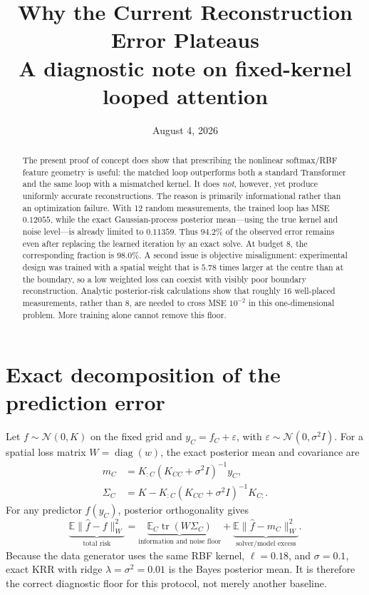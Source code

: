 \documentclass[10pt]{article}
\title{Why the Current Reconstruction Error Plateaus\\
\large A diagnostic note on fixed-kernel looped attention}
\author{}
\date{August 4, 2026}
\begin{document}
\maketitle
\vspace{-2.2em}

\begin{abstract}
The present proof of concept does show that prescribing the nonlinear
softmax/RBF feature geometry is useful: the matched loop outperforms both a
standard Transformer and the same loop with a mismatched kernel.  It does
\emph{not}, however, yet produce uniformly accurate reconstructions.  The
reason is primarily informational rather than an optimization failure.  With
12 random measurements, the trained loop has MSE $0.12055$, while the exact
Gaussian-process posterior mean---using the true kernel and noise level---is
already limited to $0.11359$.  Thus $94.2\%$ of the observed error remains
even after replacing the learned iteration by an exact solve.  At budget 8,
the corresponding fraction is $98.0\%$.  A second issue is objective
misalignment: experimental design was trained with a spatial weight that is
$5.78$ times larger at the centre than at the boundary, so a low weighted loss
can coexist with visibly poor boundary reconstruction.  Analytic posterior-risk
calculations show that roughly 16 well-placed measurements, rather than 8, are
needed to cross MSE $10^{-2}$ in this one-dimensional problem.  More training
alone cannot remove this floor.
\end{abstract}

\section{Exact decomposition of the prediction error}

Let $f\sim\mathcal N(0,K)$ on the fixed grid and
$y_C=f_C+\varepsilon$, with
$\varepsilon\sim\mathcal N(0,\sigma^2 I)$.  For a spatial loss matrix
$W=\operatorname{diag}(w)$, the exact posterior mean and covariance are
\begin{align}
 m_C &= K_{:C}(K_{CC}+\sigma^2I)^{-1}y_C,\\
 \Sigma_C &= K-K_{:C}(K_{CC}+\sigma^2I)^{-1}K_{C:}.
\end{align}
For any predictor $\widehat f(y_C)$, posterior orthogonality gives
\begin{equation}
 \underbrace{\mathbb E\|\widehat f-f\|_W^2}_{\text{total risk}}
 =
 \underbrace{\mathbb E_C\operatorname{tr}(W\Sigma_C)}_{\text{information and noise floor}}
 +
 \underbrace{\mathbb E\|\widehat f-m_C\|_W^2}_{\text{solver/model excess}}.
 \label{eq:decomposition}
\end{equation}
Because the data generator uses the same RBF kernel, $\ell=0.18$, and
$\sigma=0.1$, exact KRR with ridge $\lambda=\sigma^2=0.01$ is the Bayes
posterior mean.  It is therefore the correct diagnostic floor for this
protocol, not merely another baseline.
\end{document}
